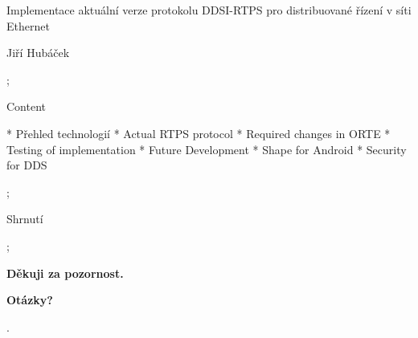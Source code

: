 

\worktype[M/CZ]

\slideshow

\tit Implementace aktuální verze protokolu DDSI-RTPS pro distribuované řízení v síti Ethernet

\subtit Jiří Hubáček

\pg;


\sec Content

* Přehled technologií
* Actual RTPS protocol
* Required changes in ORTE
* Testing of implementation
* Future Development
* Shape for Android
* Security for DDS

\pg;










\sec Shrnutí

\pg;

\null
\vskip2cm
\centerline{\typosize[35/40]\bf Děkuji za pozornost.}

\vskip2cm
\centerline{\Blue\typosize[60/70]\bf Otázky?}

\pg.

